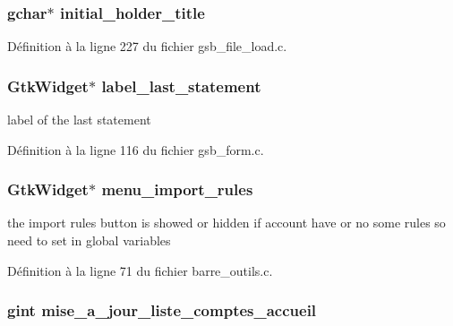 \subsubsection[{initial\_\-holder\_\-title}]{\setlength{\rightskip}{0pt plus 5cm}gchar$\ast$ {\bf initial\_\-holder\_\-title}}\label{navigation_8c_a2b411f03999259d3ba57ceb09d126c6d}


Définition à la ligne 227 du fichier gsb\_\-file\_\-load.c.

\subsubsection[{label\_\-last\_\-statement}]{\setlength{\rightskip}{0pt plus 5cm}GtkWidget$\ast$ {\bf label\_\-last\_\-statement}}\label{navigation_8c_a1d4fbf807088a54821529a81f72bdd07}
label of the last statement 

Définition à la ligne 116 du fichier gsb\_\-form.c.

\subsubsection[{menu\_\-import\_\-rules}]{\setlength{\rightskip}{0pt plus 5cm}GtkWidget$\ast$ {\bf menu\_\-import\_\-rules}}\label{navigation_8c_ae624b78f586a9e3f5d60e6f2e2866819}
the import rules button is showed or hidden if account have or no some rules so need to set in global variables 

Définition à la ligne 71 du fichier barre\_\-outils.c.

\subsubsection[{mise\_\-a\_\-jour\_\-liste\_\-comptes\_\-accueil}]{\setlength{\rightskip}{0pt plus 5cm}gint {\bf mise\_\-a\_\-jour\_\-liste\_\-comptes\_\-accueil}}\label{navigation_8c_a018917e8dacfd8fbe4e94d0f99a59c08}


